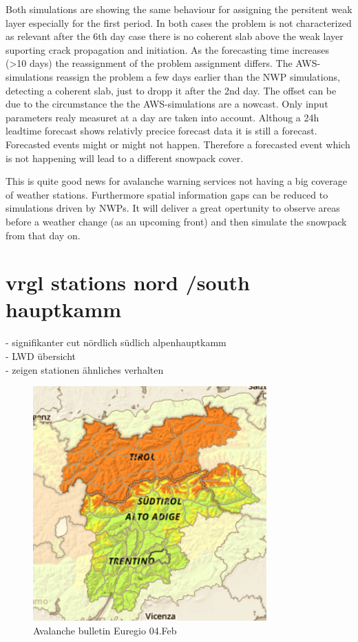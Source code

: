 \noindent Both simulations are showing the same behaviour for assigning the persitent weak layer especially for the first period. In both cases the
problem is not characterized as relevant after the 6th day case there is no coherent slab above the weak layer suporting crack propagation
and initiation. As the forecasting time increases (>10 days) the reassignment of the problem assignment differs. The AWS-simulations
reassign the problem a few days earlier than the NWP simulations, detecting a coherent slab, just to dropp it after the 2nd day. 
The offset can be due to the circumstance the the AWS-simulations are a nowcast. Only input parameters realy measuret at a day are taken into
account. Althoug a 24h leadtime forecast shows relativly precice forecast data it is still a forecast. Forecasted events might or might not 
happen. Therefore a forecasted event which is not happening will lead to a different snowpack cover. 

\noindent This is quite good news for avalanche warning services not having a big coverage of weather stations. Furthermore spatial information 
gaps can be reduced to simulations driven by NWPs. It will deliver a great opertunity to observe areas before a weather change (as an upcoming front)
and then simulate the snowpack from that day on. 



\section{ vrgl stations nord /south hauptkamm}


- signifikanter cut nördlich südlich alpenhauptkamm\\
- LWD übersicht\\
- zeigen stationen ähnliches verhalten
\begin{figure}[ht]
    \centering
    \includegraphics[width=0.8\textwidth]{Figures/figures_avapro/station_comp/report_feb_pap.png}
    \caption{Avalanche bulletin Euregio 04.Feb }
    \label{fig:ava_report_feb}
\end{figure}

